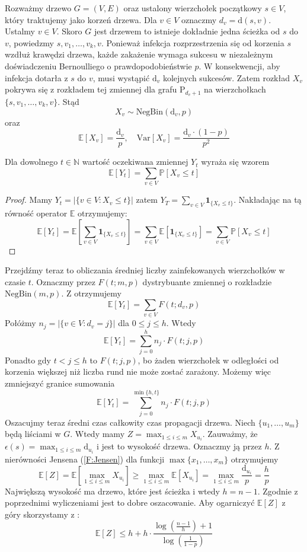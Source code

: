 Rozważmy drzewo $G = (V, E)$ oraz ustalony wierzchołek początkowy $s \in V$, 
który traktujemy jako korzeń drzewa. Dla $v\in V$ oznaczmy  $d_v=\mathrm{d}(s,v)$. Ustalmy $v\in V$. Skoro $G$ jest drzewem to istnieje dokładnie jedna ścieżka od $s$ do $v$, powiedzmy $s,v_1,\dots,v_k, v$. Ponieważ infekcja rozprzestrzenia się od korzenia $s$ wzdłuż krawędzi drzewa, 
każde zakażenie wymaga sukcesu w niezależnym doświadczeniu Bernoulliego o prawdopodobieństwie $p$.
W konsekwencji, aby infekcja dotarła z $s$ do $v$, 
musi wystąpić $\mathrm{d}_v$ kolejnych sukcesów. Zatem rozkład $X_v$ pokrywa się z rozkładem tej zmiennej dla grafu $\mathrm{P}_{d_v+1}$ na wierzchołkach $\{s,v_1,\dots,v_k, v\}$. Stąd 
\[
    X_v\sim \mathrm{NegBin}(\mathrm{d}_v,p)
\]
oraz
\[
    \mathbb{E}[X_v] = \frac{\mathrm{d}_v}{p}, \quad \mathrm{Var}[X_v] = \frac{\mathrm{d}_v\cdot(1 - p)}{p^2}
\]
\begin{lemma}\label{L:Formula_EYt}
Dla dowolnego $t\in\mathbb{N}$ wartość oczekiwana zmiennej $Y_t$ wyraża się wzorem
\[
    \mathbb{E}[Y_t] = \sum_{v\in V} \mathbb{P}[X_v \le t]
\]    
\end{lemma}

\begin{proof}
Mamy $Y_t=|\{v\in V: X_v \le t\}|$ zatem $Y_T=\sum_{v\in V}  \mathbf{1}_{\{X_v\le t\}}$. Nakładając na tą równość operator $\mathbb{E}$ otrzymujemy:
\[
    \mathbb{E}[Y_t] = \mathbb{E}\left[ \sum_{v\in V}  \mathbf{1}_{\{X_v\le t\}}\right]= \sum_{v\in V} \mathbb{E}[\mathbf{1}_{\{X_v\le t\}}] = \sum_{v\in V} \mathbb{P}[X_v \le t]
\]    
\end{proof}

Przejdźmy teraz to obliczania średniej liczby zainfekowanych wierzchołków w czasie $t$. Oznaczmy przez $F(t;m,p)$ dystrybuante zmiennej o rozkładzie $\mathrm{NegBin}(m,p)$. Z  otrzymujemy
\[
    \mathbb{E}[Y_t] = \sum_{v\in V} F(t; d_v, p)
\]
Połóżmy $n_j = |\{v\in V: d_v=j\}|$ dla $0\le j \le h$. Wtedy 
\[
    \mathbb{E}[Y_t] = \sum_{j=0}^{h} n_j\cdot F(t; j, p)
\]
Ponadto gdy $t<j\le h$ to $F(t; j, p)$, bo żaden wierzchołek w odległości od korzenia większej niż liczba rund nie może zostać zarażony. Możemy więc zmniejszyć granice sumowania 
\[
    \mathbb{E}[Y_t] = \sum_{j=0}^{\min\{h,t\}} n_j\cdot F(t; j, p)
\]
Oszacujmy teraz średni czas całkowity czas propagacji drzewa.
Niech $\{u_1,\dots, u_m\}$ będą liściami w $G$. Wtedy mamy $Z = \max_{1\le i \le m} X_{u _i}$.
Zauważmy, że $\epsilon(s) = \max_{1\le i \le m} \mathrm{d}_{u_i}$ i jest to wysokość drzewa. Oznaczmy ją przez $h$. Z nierówności Jensena (\cref{F:Jensen}) dla funkcji $\max\{x_1,\dots,x_m\}$ otrzymujemy
\[
    \mathbb{E}[Z]=\mathbb{E}[\max_{1\le i \le m} X_{u _i}] \ge \max_{1\le i \le m} \mathbb{E}[X_{u _i}] = \max_{1\le i \le m} \frac{\mathrm{d}_{u_i}}{p} = \frac{h}{p}
\]
Największą wysokość ma drzewo, które jest ścieżka i wtedy $h=n-1$. Zgodnie z poprzednimi wyliczeniami jest to dobre oszacowanie. Aby ogarniczyć $\mathbb{E}[Z]$ z góry skorzystamy z :
\[
    \mathbb{E}[Z] \le h  + h \cdot \frac{\log(\frac{n-1}{h}) + 1}{\log(\frac{1}{1-p})}
\]
